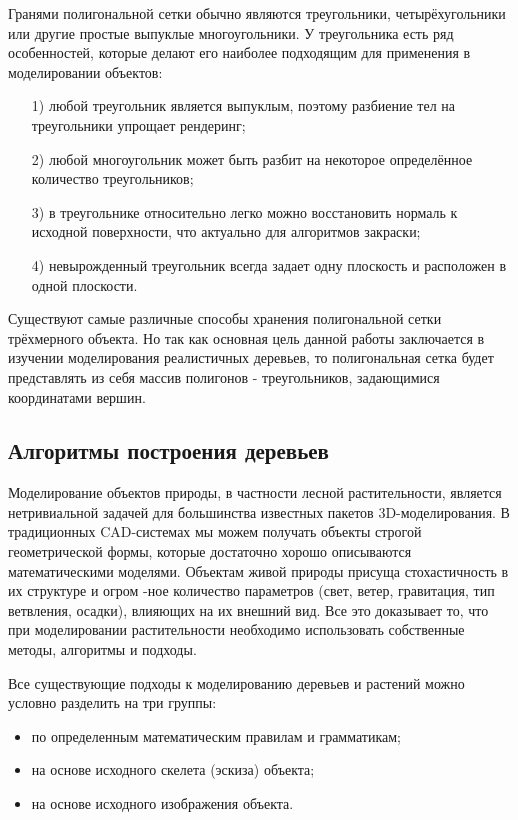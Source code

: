 \documentclass[54pt, a4paper]{article}
\begin{document}
	Гранями полигональной сетки обычно являются треугольники, четырёхугольники или другие простые выпуклые многоугольники. У треугольника есть ряд
	особенностей, которые делают его наиболее подходящим для применения в моделировании объектов:
	\begin{enumerate}
		\item[1)] любой треугольник является выпуклым, поэтому разбиение тел на треугольники упрощает рендеринг;
		\item[2)] любой многоугольник может быть разбит на некоторое определённое количество треугольников;
		\item[3)] в треугольнике относительно легко можно восстановить нормаль к исходной
		поверхности, что актуально для алгоритмов закраски;
		\item[4)] невырожденный треугольник всегда
		задает одну плоскость и расположен в одной плоскости.
	\end{enumerate}

	Существуют самые различные способы хранения полигональной сетки трёхмерного объекта. Но так как основная цель данной работы заключается в изучении моделирования реалистичных деревьев, то полигональная сетка будет представлять из себя массив полигонов - треугольников, задающимися координатами вершин.
	
	\subsection{Алгоритмы построения деревьев}
	
	Моделирование объектов природы, в частности лесной растительности, является нетривиальной задачей для большинства известных пакетов 3D-моделирования. В традиционных CAD-системах мы можем получать объекты строгой геометрической формы, которые достаточно хорошо описываются математическими моделями. Объектам живой природы присуща стохастичность в их структуре и огром -ное количество параметров (свет, ветер, гравитация, тип ветвления, осадки), влияющих на их внешний вид. Все это доказывает то, что при моделировании растительности необходимо использовать собственные методы, алгоритмы и подходы.
	
	Все существующие подходы к моделированию деревьев и растений можно условно разделить на три группы:
	
	\begin{itemize}
		\item по определенным математическим правилам и грамматикам;
		\item на основе исходного скелета (эскиза) объекта;
		\item на основе исходного изображения объекта.
	\end{itemize}
	
\end{document}
